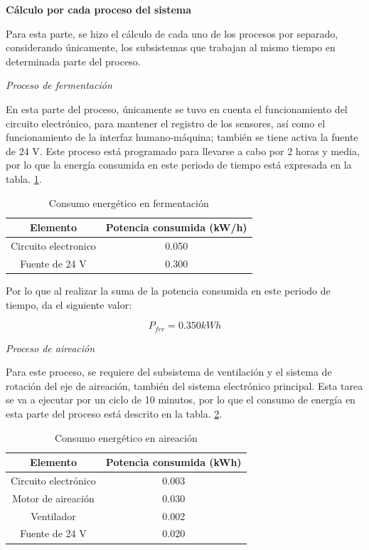 \textbf{Cálculo por cada proceso del sistema}

Para esta parte, se hizo el cálculo de cada uno de los procesos por separado, considerando únicamente, los subsistemas que trabajan al mismo tiempo en determinada parte del proceso.

\textit{Proceso de fermentación}

En esta parte del proceso, únicamente se tuvo en cuenta el funcionamiento del circuito electrónico, para mantener el registro de los sensores, así como el funcionamiento de la interfaz humano-máquina; también se tiene activa la fuente de 24 V. Este proceso está programado para llevarse a cabo por 2 horas y media, por lo que la energía consumida en este periodo de tiempo está expresada en la tabla. \ref{tab:fermentacion_elec}.


\begin{table}
    \centering
\caption{Consumo energético en fermentación}
\label{tab:fermentacion_elec}
    \begin{tabular}{|c|c|} \hline 
         Elemento&  Potencia consumida (kW/h)\\ \hline 
         Circuito electronico&  0.050\\ \hline 
         Fuente de 24 V&  0.300\\\hline
    \end{tabular}
    
    
\end{table}

Por lo que al realizar la suma de la potencia consumida en este periodo de tiempo, da el siguiente valor:

\begin{equation*}
    P_{fer} = 0.350   kWh
\end{equation*}

\textit{Proceso de aireación}

Para este proceso, se requiere del subsistema de ventilación y el sistema de rotación del eje de aireación, también del sistema electrónico principal. Esta tarea se va a ejecutar por un ciclo de 10 minutos, por lo que el consumo de energía en esta parte del proceso está descrito en la tabla. \ref{tab:Airo_compo}.

\begin{table}
    \centering
\caption{Consumo energético en aireación}
\label{tab:Airo_compo}
    \begin{tabular}{|c|c|} \hline 
         Elemento&  Potencia consumida (kWh)\\ \hline 
         Circuito electrónico&  0.003\\ \hline 
 Motor de aireación&0.030\\ \hline 
 Ventilador&0.002\\ \hline 
         Fuente de 24 V&  0.020\\\hline
    \end{tabular}
    
    
\end{table}

